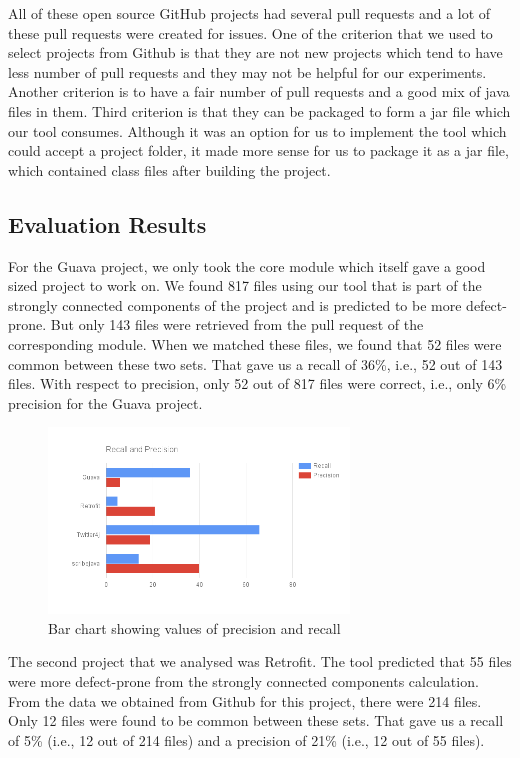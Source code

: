 All of these open source GitHub projects had several pull requests and a lot of these pull requests were created for issues. One of the criterion that we used to select projects from Github is that they are not new projects which tend to have less number of pull requests and they may not be helpful for our experiments. Another criterion is to have a fair number of pull requests and a good mix of java files in them. Third criterion is that they can be packaged to form a jar file which our tool consumes. Although it was an option for us to implement the tool which could accept a project folder, it made more sense for us to package it as a jar file, which contained class files after building the project.

\subsection{Evaluation Results}

For the Guava project, we only took the core module which itself gave a good sized project to work on. We found 817 files using our tool that is part of the strongly connected components of the project and is predicted to be more defect-prone. But only 143 files were retrieved from the pull request of the corresponding module. When we matched these files, we found that 52 files were common between these two sets. That gave us a recall of 36\%, i.e., 52 out of 143 files. With respect to precision, only 52 out of 817 files were correct, i.e., only 6\% precision for the Guava project.

\begin{figure}[h!]
\includegraphics[width=8cm]{recall-precision}
\caption{Bar chart showing values of precision and recall}
\label{fig:precision_recall}
\end{figure}

The second project that we analysed was Retrofit. The tool predicted that 55 files were more defect-prone from the strongly connected components calculation. From the data we obtained from Github for this project, there were 214 files. Only 12 files were found to be common between these sets. That gave us a recall of 5\% (i.e., 12 out of 214 files) and a precision of 21\% (i.e., 12 out of 55 files).\\

